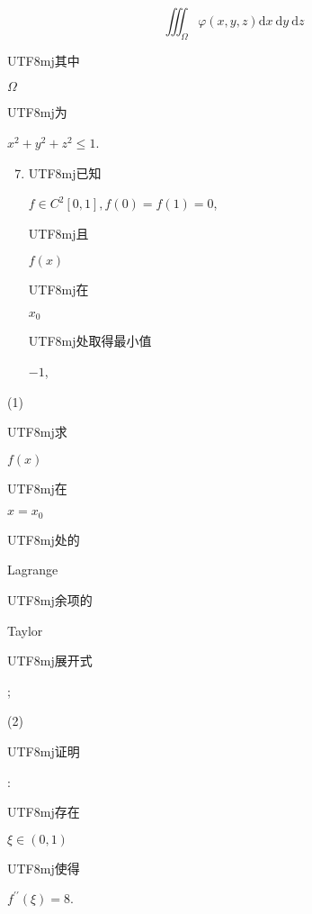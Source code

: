 \documentclass[10pt]{article}
\begin{document}
$$
\iiint_{\Omega} \varphi(x, y, z) \mathrm{d} x \mathrm{~d} y \mathrm{~d} z
$$
\begin{CJK}{UTF8}{mj}其中\end{CJK} $\Omega$ \begin{CJK}{UTF8}{mj}为\end{CJK} $x^{2}+y^{2}+z^{2} \leqslant 1$.

\begin{enumerate}
  \setcounter{enumi}{6}
  \item \begin{CJK}{UTF8}{mj}已知\end{CJK} $f \in C^{2}[0,1], f(0)=f(1)=0$, \begin{CJK}{UTF8}{mj}且\end{CJK} $f(x)$ \begin{CJK}{UTF8}{mj}在\end{CJK} $x_{0}$ \begin{CJK}{UTF8}{mj}处取得最小值\end{CJK} $-1$,
\end{enumerate}
(1) \begin{CJK}{UTF8}{mj}求\end{CJK} $f(x)$ \begin{CJK}{UTF8}{mj}在\end{CJK} $x=x_{0}$ \begin{CJK}{UTF8}{mj}处的\end{CJK} Lagrange \begin{CJK}{UTF8}{mj}余项的\end{CJK} Taylor \begin{CJK}{UTF8}{mj}展开式\end{CJK};

(2) \begin{CJK}{UTF8}{mj}证明\end{CJK}: \begin{CJK}{UTF8}{mj}存在\end{CJK} $\xi \in(0,1)$ \begin{CJK}{UTF8}{mj}使得\end{CJK} $f^{\prime \prime}(\xi)=8$.
\end{document}
